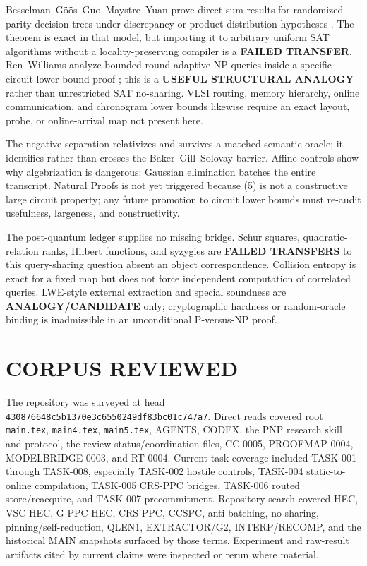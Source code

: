 \documentclass[11pt]{article}
\begin{document}
Besselman--G\"o\"os--Guo--Maystre--Yuan prove direct-sum results for randomized
parity decision trees under discrepancy or product-distribution hypotheses
\cite{bggmy}.  The theorem is exact in that model, but importing it to
arbitrary uniform SAT algorithms without a locality-preserving compiler is a
\textbf{FAILED TRANSFER}.  Ren--Williams analyze bounded-round adaptive NP
queries inside a specific circuit-lower-bound proof \cite{rw}; this is a
\textbf{USEFUL STRUCTURAL ANALOGY} rather than unrestricted SAT no-sharing.
VLSI routing, memory hierarchy, online communication, and chronogram lower
bounds likewise require an exact layout, probe, or online-arrival map not
present here.

The negative separation relativizes and survives a matched semantic oracle;
it identifies rather than crosses the Baker--Gill--Solovay barrier.  Affine
controls show why algebrization is dangerous: Gaussian elimination batches
the entire transcript.  Natural Proofs is not yet triggered because (5) is
not a constructive large circuit property; any future promotion to circuit
lower bounds must re-audit usefulness, largeness, and constructivity.

The post-quantum ledger supplies no missing bridge.  Schur squares,
quadratic-relation ranks, Hilbert functions, and syzygies are
\textbf{FAILED TRANSFERS} to this query-sharing question absent an object
correspondence.  Collision entropy is exact for a fixed map but does not force
independent computation of correlated queries.  LWE-style external
extraction and special soundness are \textbf{ANALOGY/CANDIDATE} only;
cryptographic hardness or random-oracle binding is inadmissible in an
unconditional P-versus-NP proof.

\section{CORPUS REVIEWED}
The repository was surveyed at head
\texttt{430876648c5b1370e3c6550249df83bc01c747a7}.  Direct reads covered root
\texttt{main.tex}, \texttt{main4.tex}, \texttt{main5.tex}, AGENTS, CODEX, the
PNP research skill and protocol, the review status/coordination files,
CC-0005, PROOFMAP-0004, MODELBRIDGE-0003, and RT-0004.  Current task coverage
included TASK-001 through TASK-008, especially TASK-002 hostile controls,
TASK-004 static-to-online compilation, TASK-005 CRS-PPC bridges, TASK-006
routed store/reacquire, and TASK-007 precommitment.  Repository search covered
HEC, VSC-HEC, G-PPC-HEC, CRS-PPC, CCSPC, anti-batching, no-sharing,
pinning/self-reduction, QLEN1, EXTRACTOR/G2, INTERP/RECOMP, and the historical
MAIN snapshots surfaced by those terms.  Experiment and raw-result artifacts
cited by current claims were inspected or rerun where material.
\end{document}
